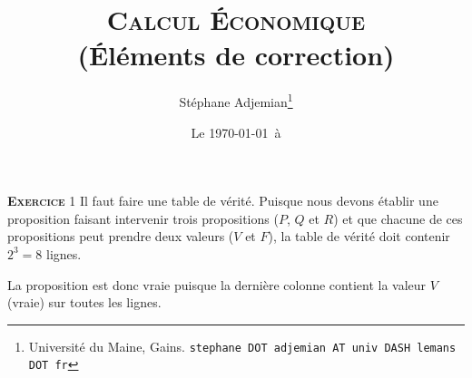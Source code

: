\documentclass[10pt,a4paper,notitlepage]{article}
\newcommand{\exercice}[1]{\textsc{\textbf{Exercice}} #1}
\begin{document}
\title{\textsc{Calcul Économique}\\\textbf{(Éléments de correction)}}
\author{Stéphane Adjemian\thanks{Université du Maine, Gains. \texttt{stephane DOT adjemian AT univ DASH lemans DOT fr}}}
\date{Le \today\ à \thistime}

\maketitle

\exercice{1} Il faut faire une table de vérité. Puisque nous devons
établir une proposition faisant intervenir trois propositions ($P$,
$Q$ et $R$) et que chacune de ces propositions peut prendre deux
valeurs ($V$ et $F$), la table de vérité doit contenir $2^3=8$ lignes.

\begin{table}[H]
  \centering
{}
\end{table}

La proposition est donc vraie puisque la dernière colonne contient la
valeur $V$ (vraie) sur toutes les lignes.

\bigskip
\end{document}

